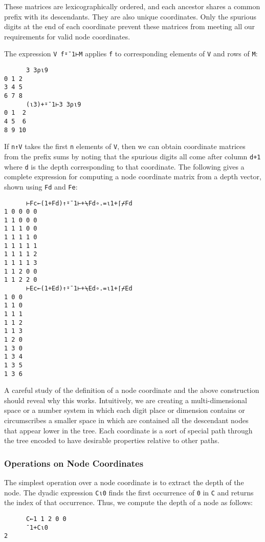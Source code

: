 \documentclass[numbers,preprint]{sigplanconf}
\begin{document}
\noindent
These matrices are lexicographically ordered, and each ancestor
shares a common prefix with its descendants. They are also unique
coordinates. Only the spurious digits at the end of each coordinate
prevent these matrices from meeting all our requirements for valid
node coordinates.

The expression \verb;V f⍤¯1⊢M; applies \verb;f; to corresponding elements of
\verb;V; and rows of \verb;M;:

\begin{verbatim}
      3 3⍴⍳9
0 1 2
3 4 5
6 7 8
      (⍳3)+⍤¯1⊢3 3⍴⍳9
0 1  2
4 5  6
8 9 10
\end{verbatim}

\noindent
If \verb;n↑V; takes the first \verb;n; elements of \verb;V;, then we can obtain coordinate
matrices from the prefix sums by noting that the spurious digits
all come after column \verb;d+1; where \verb;d; is the depth corresponding to that
coordinate. The following gives a complete expression for computing
a node coordinate matrix from a depth vector, shown using \verb;Fd; and \verb;Fe;:

\begin{verbatim}
      ⊢Fc←(1+Fd)↑⍤¯1⊢+⍀Fd∘.=⍳1+⌈⌿Fd
1 0 0 0 0
1 1 0 0 0
1 1 1 0 0
1 1 1 1 0
1 1 1 1 1
1 1 1 1 2
1 1 1 1 3
1 1 2 0 0
1 1 2 2 0
      ⊢Ec←(1+Ed)↑⍤¯1⊢+⍀Ed∘.=⍳1+⌈⌿Ed
1 0 0
1 1 0
1 1 1
1 1 2
1 1 3
1 2 0
1 3 0
1 3 4
1 3 5
1 3 6
\end{verbatim}

A careful study of the definition of a node coordinate and the
above construction should reveal why this works. Intuitively, we are
creating a multi-dimensional space or a number system in which each
digit place or dimension contains or circumscribes a smaller space
in which are contained all the descendant nodes that appear lower in
the tree. Each coordinate is a sort of special path through the tree
encoded to have desirable properties relative to other paths.

\subsubsection{Operations on Node Coordinates}

The simplest operation over a node coordinate is to extract the depth
of the node.
The dyadic expression \verb;C⍳0; finds the first occurrence of \verb;0;
in \verb;C; and returns the index of that occurrence.
Thus, we compute the depth of a node as follows:

\begin{verbatim}
      C←1 1 2 0 0
      ¯1+C⍳0
2
\end{verbatim}
\end{document}
